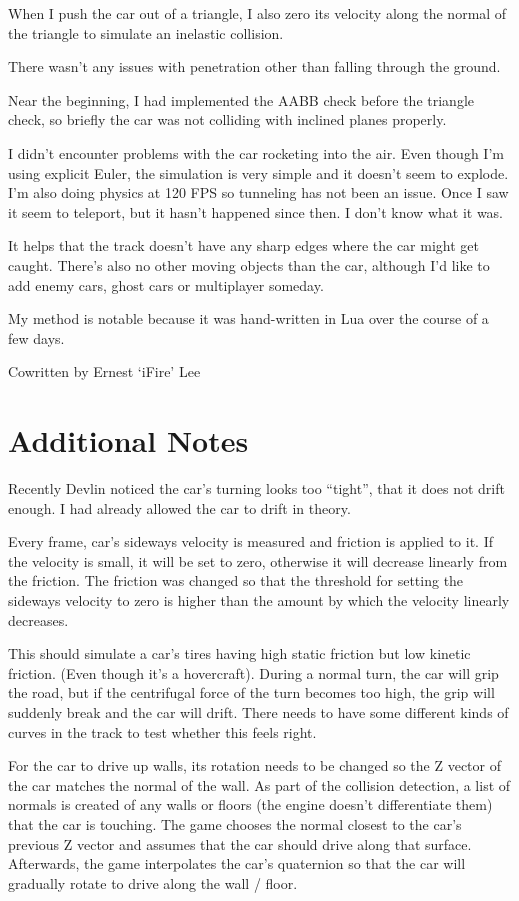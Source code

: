 \documentclass[]{book}
\begin{document}
When I push the car out of a triangle, I also zero its velocity along
the normal of the triangle to simulate an inelastic collision.

There wasn't any issues with penetration other than falling through the
ground.

Near the beginning, I had implemented the AABB check before the triangle
check, so briefly the car was not colliding with inclined planes
properly.

I didn't encounter problems with the car rocketing into the air. Even
though I'm using explicit Euler, the simulation is very simple and it
doesn't seem to explode. I'm also doing physics at 120 FPS so tunneling
has not been an issue. Once I saw it seem to teleport, but it hasn't
happened since then. I don't know what it was.

It helps that the track doesn't have any sharp edges where the car might
get caught. There's also no other moving objects than the car, although
I'd like to add enemy cars, ghost cars or multiplayer someday.

My method is notable because it was hand-written in Lua over the course
of a few days.

Cowritten by Ernest `iFire' Lee

\section{Additional Notes}\label{additional-notes}

Recently Devlin noticed the car's turning looks too ``tight'', that it
does not drift enough. I had already allowed the car to drift in theory.

Every frame, car's sideways velocity is measured and friction is applied
to it. If the velocity is small, it will be set to zero, otherwise it
will decrease linearly from the friction. The friction was changed so
that the threshold for setting the sideways velocity to zero is higher
than the amount by which the velocity linearly decreases.

This should simulate a car's tires having high static friction but low
kinetic friction. (Even though it's a hovercraft). During a normal turn,
the car will grip the road, but if the centrifugal force of the turn
becomes too high, the grip will suddenly break and the car will drift.
There needs to have some different kinds of curves in the track to test
whether this feels right.

For the car to drive up walls, its rotation needs to be changed so the Z
vector of the car matches the normal of the wall. As part of the
collision detection, a list of normals is created of any walls or floors
(the engine doesn't differentiate them) that the car is touching. The
game chooses the normal closest to the car's previous Z vector and
assumes that the car should drive along that surface. Afterwards, the
game interpolates the car's quaternion so that the car will gradually
rotate to drive along the wall / floor.
\end{document}
